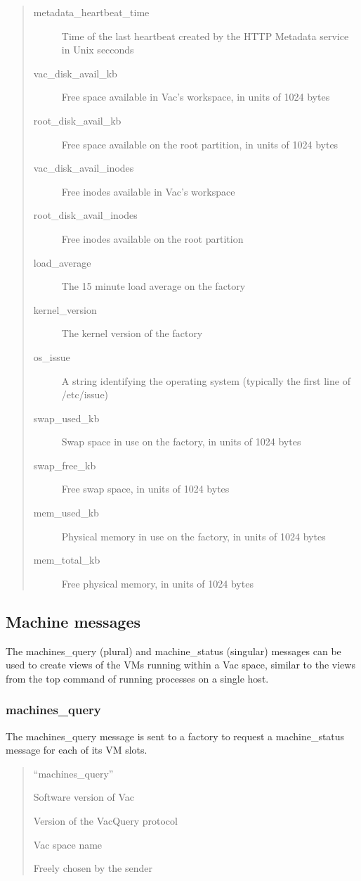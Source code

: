 \documentclass[12pt,a4paper]{article}
\begin{document}
\begin{quote}
\begin{description}
\item[metadata\_heartbeat\_time] Time of the last heartbeat created by the HTTP Metadata service in Unix secconds
\item[vac\_disk\_avail\_kb] Free space available in Vac's workspace, in units of 1024 bytes
\item[root\_disk\_avail\_kb] Free space available on the root partition, in units of 1024 bytes
\item[vac\_disk\_avail\_inodes] Free inodes available in Vac's workspace
\item[root\_disk\_avail\_inodes] Free inodes available on the root partition
\item[load\_average] The 15 minute load average on the factory
\item[kernel\_version] The kernel version of the factory
\item[os\_issue] A string identifying the operating system (typically the first line of /etc/issue)
\item[swap\_used\_kb] Swap space in use on the factory, in units of 1024 bytes
\item[swap\_free\_kb] Free swap space, in units of 1024 bytes
\item[mem\_used\_kb] Physical memory in use on the factory, in units of 1024 bytes
\item[mem\_total\_kb] Free physical memory, in units of 1024 bytes
\end{description}
\end{quote}

\subsection{Machine messages}
\label{sec:machinemessages}

The machines\_query (plural) and machine\_status (singular) messages can
be used to create views of the VMs running within a Vac space, similar to
the views from the top command of running processes on a single host.

\subsubsection{machines\_query}
\label{sec:machinesquery}

The machines\_query message is sent to a factory to request a 
machine\_status message for each of its VM slots.

\begin{quote}
\begin{description}
\setlength{\parskip}{0pt}
\item[message\_type] ``machines\_query''
\item[vac\_version] Software version of Vac
\item[vacquery\_version] Version of the VacQuery protocol
\item[space] Vac space name
\item[cookie] Freely chosen by the sender
\end{description}
\end{quote}
\end{document}
